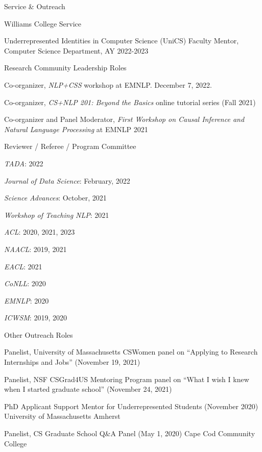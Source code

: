 \documentclass{resume} %
\begin{document}

\begin{rSection}{Service \& Outreach}

\begin{rSubsection}{Williams College Service}{}{}{}
\item Underrepresented Identities in Computer Science (UniCS) Faculty Mentor, Computer Science Department, AY 2022-2023
\end{rSubsection}

\begin{rSubsection}{Research Community Leadership Roles}{}{}{}
\item Co-organizer, \emph{NLP+CSS} workshop at EMNLP. December 7, 2022. 
\item Co-organizer, \emph{CS+NLP 201: Beyond the Basics} online tutorial series (Fall 2021)
\item Co-organizer and Panel Moderator, \emph{First Workshop on Causal Inference and Natural Language Processing} at EMNLP 2021
\end{rSubsection}

\noindent
\begin{rSubsection}{Reviewer / Referee / Program Committee}{}{}{}
\item \emph{TADA}: 2022
\item \emph{Journal of Data Science}: February, 2022
\item \emph{Science Advances}: October, 2021
\item \emph{Workshop of Teaching NLP}: 2021
\item \emph{ACL}: 2020, 2021, 2023
\item \emph{NAACL}: 2019, 2021
\item \emph{EACL}: 2021 
\item \emph{CoNLL}: 2020 
\item \emph{EMNLP}: 2020 
\item \emph{ICWSM}: 2019, 2020
\end{rSubsection}

\begin{rSubsection}{Other Outreach Roles}{}{}{}
\item Panelist, University of Massachusetts CSWomen panel on ``Applying to Research Internships and Jobs'' (November 19, 2021)
\item Panelist, NSF CSGrad4US Mentoring Program panel on ``What I wish I knew when I started graduate school'' (November 24, 2021)
\item 
{PhD Applicant Support Mentor for Underrepresented Students} ({November 2020}) {University of Massachusetts Amherst}
\item 
{Panelist, CS Graduate School Q\&A Panel} ({May 1, 2020}) {Cape Cod Community College}


\end{rSubsection}
\end{rSection}
\end{document}
